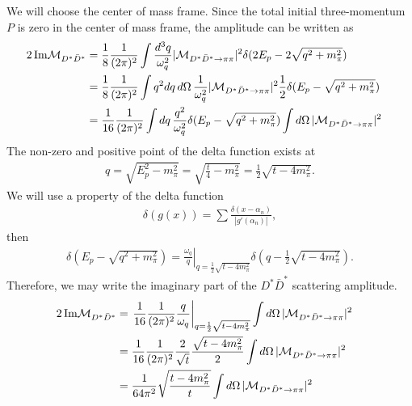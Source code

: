 \documentclass[aps,prd,preprintnumbers,showpacs,showkeys,nofootinbib,
superscriptaddress,fleqn,floatfix,tightenlines, 10pt]{revtex4-1}
\begin{document}
We will choose the center of mass frame. Since the total initial three-momentum $P$ is zero in the center of mass frame,
the amplitude can be written as
\begin{align}
	2\, \mathrm{Im} \mathcal{M}_{D^* \bar{D}^*} & = \frac{1}{8} \frac{1}{(2\pi)^2} \int { \frac{d^3 q}{\omega_q^2}
	|\mathcal{M}_{{D^* \bar{D}^*} \rightarrow \pi\pi}|^2 \delta(2E_p - 2 \sqrt{q^2 + m_\pi^2})} \cr
	& = \frac{1}{8} \frac{1}{(2\pi)^2} \int {q^2dq\, d\Omega\, \frac{1}{\omega_q^2}
	|\mathcal{M}_{{D^* \bar{D}^*} \rightarrow \pi\pi}|^2 \frac{1}{2} \delta(E_p - \sqrt{q^2 + m_\pi^2})}  \cr
	& = \frac{1}{16} \frac{1}{(2\pi)^2} \int {dq\, \frac{q^2}{\omega_q^2} \delta(E_p - \sqrt{q^2 + m_\pi^2})}
	\int {d\Omega \, |\mathcal{M}_{{D^* \bar{D}^*} \rightarrow \pi\pi}|^2}
\end{align}
The non-zero and positive point of the delta function exists at
\begin{align}
	q = \sqrt{E_p^2 - m_\pi^2} = \sqrt{\frac{t}{4} - m_\pi^2} = \frac{1}{2} \sqrt{t - 4m_\pi^2}.
\end{align}
We will use a property of the delta function
\begin{align}
	\delta (g(x)) = \sum{ \frac{\delta(x - \alpha_n)}{|g'(\alpha_n)|}},
\end{align}
then
\begin{align}
	\delta(E_p - \sqrt{q^2 + m_\pi^2}) =\left. \frac{\omega_q}{q}
	\right|_{q = \frac{1}{2} \sqrt{t - 4m_\pi^2}}
	\delta (q - \frac{1}{2} \sqrt{t - 4m_\pi^2}).
\end{align}
Therefore, we may write the imaginary part of the $D^* \bar{D}^*$ scattering amplitude.
\begin{align} \label{eq79}
	2\, \mathrm{Im} \mathcal{M}_{D^* \bar{D}^*} & = \left. \frac{1}{16} \frac{1}{(2\pi)^2}
	\frac{q}{\omega_q} \right|_{q = \frac{1}{2} \sqrt{t - 4m_\pi^2}}
	\int {d\Omega \, |\mathcal{M}_{{D^* \bar{D}^*} \rightarrow \pi\pi}|^2} \cr
	& = \frac{1}{16} \frac{1}{(2\pi)^2} \frac{2}{\sqrt{t}} \frac{\sqrt{t - 4m_\pi^2}}{2}
	\int {d\Omega \, |\mathcal{M}_{{D^* \bar{D}^*} \rightarrow \pi\pi}|^2} \cr
	& = \frac{1}{64 \pi^2} \sqrt{\frac{t - 4m_\pi^2}{t}} \int {d\Omega \,
	|\mathcal{M}_{{D^* \bar{D}^*} \rightarrow \pi\pi}|^2}
\end{align}
\end{document}
